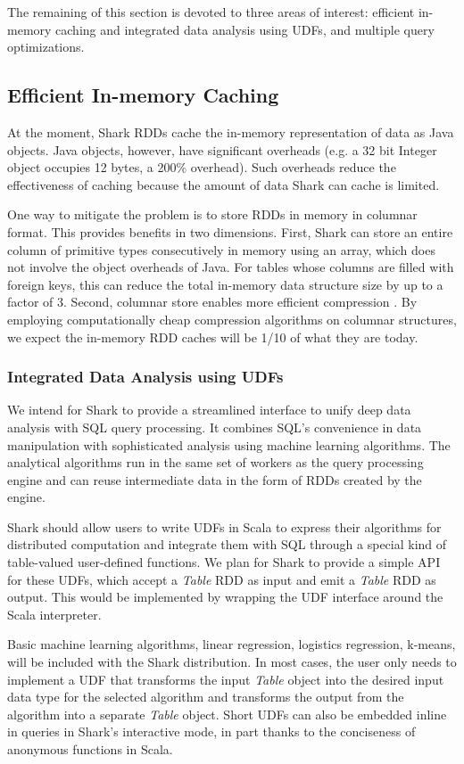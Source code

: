 The remaining of this section is devoted to three areas of interest: efficient in-memory caching and integrated data analysis using UDFs, and multiple query optimizations.


\subsection{Efficient In-memory Caching}

At the moment, Shark RDDs cache the in-memory representation of data as Java objects. Java objects, however, have significant overheads (e.g. a 32 bit Integer object occupies 12 bytes, a 200\% overhead). Such overheads reduce the effectiveness of caching because the amount of data Shark can cache is limited. 

One way to mitigate the problem is to store RDDs in memory in columnar format. This provides benefits in two dimensions. First, Shark can store an entire column of primitive types consecutively in memory using an array, which does not involve the object overheads of Java. For tables whose columns are filled with foreign keys, this can reduce the total in-memory data structure size by up to a factor of 3. Second, columnar store enables more efficient compression \cite{cstore}. By employing computationally cheap compression algorithms on columnar structures, we expect the in-memory RDD caches will be 1/10 of what they are today.

\subsubsection{Integrated Data Analysis using UDFs}
We intend for Shark to provide a streamlined interface to unify deep data analysis with SQL query processing. It combines SQL's convenience in data manipulation with sophisticated analysis using machine learning algorithms. The analytical algorithms run in the same set of workers as the query processing engine and can reuse intermediate data in the form of RDDs created by the engine.

Shark should allow users to write UDFs in Scala to express their algorithms for distributed computation and integrate them with SQL through a special kind of table-valued user-defined functions. We plan for Shark to provide a simple API for these UDFs, which accept a \emph{Table} RDD as input and emit a \emph{Table} RDD as output. This would be implemented by wrapping the UDF interface around the Scala interpreter.

Basic machine learning algorithms, \eg linear regression, logistics regression, k-means, will be included with the Shark distribution. In most cases, the user only needs to implement a UDF that transforms the input \emph{Table} object into the desired input data type for the selected algorithm and transforms the output from the algorithm into a separate \emph{Table} object. Short UDFs can also be embedded inline in queries in Shark's interactive mode, in part thanks to the conciseness of anonymous functions in Scala.


